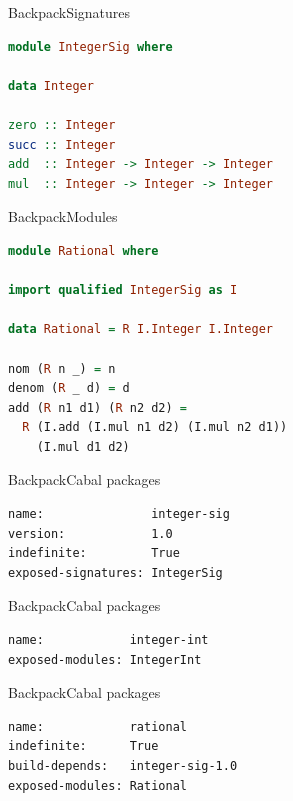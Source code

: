 \documentclass{beamer}
\begin{document}
\begin{frame}[fragile]{Backpack}{Signatures}
\begin{lstlisting}[language=Haskell]
module IntegerSig where

data Integer

zero :: Integer
succ :: Integer
add  :: Integer -> Integer -> Integer
mul  :: Integer -> Integer -> Integer
\end{lstlisting}
\end{frame}

\begin{frame}[fragile]{Backpack}{Modules}
\begin{lstlisting}[language=Haskell]
module Rational where

import qualified IntegerSig as I

data Rational = R I.Integer I.Integer

nom (R n _) = n
denom (R _ d) = d
add (R n1 d1) (R n2 d2) =
  R (I.add (I.mul n1 d2) (I.mul n2 d1))
    (I.mul d1 d2)
\end{lstlisting}
\end{frame}

\begin{frame}[fragile]{Backpack}{Cabal packages}
\begin{lstlisting}[language=Cabal,title=Integer signature package]
name:               integer-sig
version:            1.0
indefinite:         True
exposed-signatures: IntegerSig
\end{lstlisting}
\end{frame}

\begin{frame}[fragile]{Backpack}{Cabal packages}
\begin{lstlisting}[language=Cabal,title=Integer implementation package]
name:            integer-int
exposed-modules: IntegerInt
\end{lstlisting}
\end{frame}

\begin{frame}[fragile]{Backpack}{Cabal packages}
\begin{lstlisting}[language=Cabal,title=Rational ``functor'' package]
name:            rational
indefinite:      True
build-depends:   integer-sig-1.0
exposed-modules: Rational
\end{lstlisting}
\end{frame}
\end{document}

